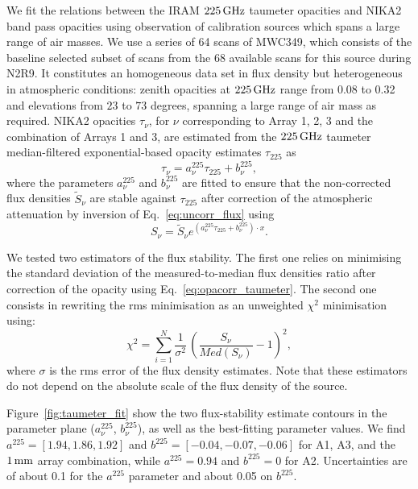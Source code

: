 We fit the relations between the IRAM
$225\,\rm{GHz}$ taumeter opacities and NIKA2 band pass opacities using
observation of calibration sources which spans a large range of air
masses. We use a series of 64 scans of MWC349, which consists of the
baseline selected subset of scans from the 68 available scans for
this source during N2R9.
It constitutes an homogeneous data set in flux density but
heterogeneous in atmospheric conditions: zenith opacities at
$225\,\rm{GHz}$ 
range from 0.08 to 0.32 and elevations from $23$ to $73$
degrees, spanning a large range of air mass as required. NIKA2 opacities
$\tau_\nu$, for $\nu$ corresponding
to Array 1, 2, 3 and the combination of Arrays 1 and 3, are estimated
from the $225\,\rm{GHz}$ taumeter median-filtered exponential-based opacity
estimates $\tau_{225}$ as
\begin{equation}  
  \tau_\nu =  a_\nu^{225}\tau_{225} + b_\nu^{225},          
\end{equation}
where the parameters $a_\nu^{225}$ and $b_\nu^{225}$ are fitted to ensure
that the non-corrected flux densities $\tilde{S}_\nu$ are stable against
$\tau_{225}$ after correction of the atmospheric attenuation by
inversion of Eq.~\ref{eq:uncorr_flux} using 
\begin{equation}  
  S_\nu = \tilde{S}_\nu e^{(a_\nu^{225}\tau_{225} + b_\nu^{225}) \cdot x}.
  \label{eq:opacorr_taumeter}
\end{equation}

We tested two estimators of the flux stability. The first one relies
on minimising the standard deviation of the measured-to-median flux
densities ratio after correction of the opacity using
Eq.~\ref{eq:opacorr_taumeter}. The second one consists in rewriting
the rms minimisation as an unweighted $\chi^2$ minimisation using:
\begin{equation}
\chi^2 = \sum_{i=1}^{N} \frac{1}{\sigma^2} \, \left( \frac{S_\nu}{Med(S_\nu)} -1 \right)^2,  
\end{equation}
where $\sigma$ is the rms error of the flux density estimates. Note
that these estimators do not depend on
the absolute scale of the flux density of the source.

Figure~\ref{fig:taumeter_fit} show the two flux-stability estimate
contours in the parameter plane ($a_\nu^{225}$, $b_\nu^{225}$), as
well as the best-fitting parameter values. We find
$a^{225} = [1.94,  1.86, 1.92]$ and $b^{225} = [-0.04,  -0.07, -0.06]$
for A1, A3, and the $1\,\rm{mm}$ array combination, while $a^{225}=0.94$ and
$b^{225}=0$ for A2. Uncertainties are of about 0.1 for the $a^{225}$
parameter and about 0.05 on $b^{225}$. 

